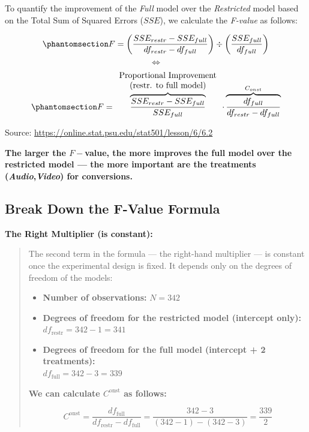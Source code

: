 \documentclass[
  letterpaper,
  DIV=11,
  numbers=noendperiod]{scrartcl}
\providecommand{\tightlist}{%
  \setlength{\itemsep}{0pt}\setlength{\parskip}{0pt}}\usepackage{longtable,booktabs,array}
\begin{document}
To quantify the improvement of the \emph{Full} model over the
\emph{Restricted} model based on the Total Sum of Squared Errors
(\(SSE\)), we calculate the \emph{F-value} as follows:

\begin{equation}\phantomsection\label{eq-FValueOrg}{
F = \left(\frac{SSE_{restr}-SSE_{full}}{df_{restr}-df_{full}} \right ) \div
     \left(\frac{SSE_{full}}{df_{full}} \right )
}\end{equation} \[
\Longleftrightarrow\] \begin{equation}\phantomsection\label{eq-FValue}{
 F = \overbrace{\frac{SSE_{restr}-SSE_{full}}{SSE_{full}}}^{
\begin{array}{c}\text{Proportional Improvement}\\
                \text{(restr. to full model)}
\end{array}} \cdot
   \overbrace{\frac{df_{full}}{df_{restr}-df_{full}}}^{C_{onst}}
}\end{equation}

Source: \url{https://online.stat.psu.edu/stat501/lesson/6/6.2}

\textbf{The larger the \(F-\)value, the more improves the full model
over the restricted model --- the more important are the treatments
(\emph{Audio},\emph{Video}) for conversions.}

\subsection{Break Down the F-Value
Formula}\label{break-down-the-f-value-formula}

\textbf{The Right Multiplier (is constant):}

\begin{quote}
The second term in the formula --- the right-hand multiplier --- is
constant once the experimental design is fixed. It depends only on the
degrees of freedom of the models:

\begin{itemize}
\tightlist
\item
  \textbf{Number of observations:} \(N = 342\)\\
\item
  \textbf{Degrees of freedom for the restricted model (intercept
  only):}\\
  \(df_{\text{restr}} = 342 - 1 = 341\)\\
\item
  \textbf{Degrees of freedom for the full model (intercept + 2
  treatments):}\\
  \(df_{\text{full}} = 342 - 3 = 339\)
\end{itemize}

\textbf{We can calculate \(C^{\text{onst}}\) as follows:}

\[
C^{\text{onst}} = \frac{df_{\text{full}}}{df_{\text{restr}} - df_{\text{full}}}
= \frac{342 - 3}{(342 - 1) - (342 - 3)} 
= \frac{339}{2}
\]
\end{quote}
\end{document}
